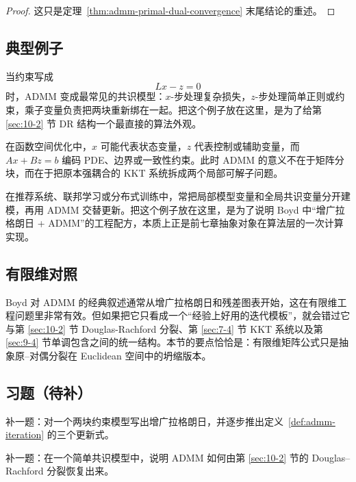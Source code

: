 \begin{proof}
这只是定理~\ref{thm:admm-primal-dual-convergence} 末尾结论的重述。
\end{proof}

\subsection{典型例子}

\begin{example}
当约束写成
\[
Lx-z=0
\]
时，ADMM 变成最常见的共识模型：$x$-步处理复杂损失，$z$-步处理简单正则或约束，乘子变量负责把两块重新绑在一起。把这个例子放在这里，是为了给第 \ref{sec:10-2} 节 DR 结构一个最直接的算法外观。
\end{example}

\begin{example}[函数空间上的一致性约束分裂]
在函数空间优化中，$x$ 可能代表状态变量，$z$ 代表控制或辅助变量，而 $Ax+Bz=b$ 编码 PDE、边界或一致性约束。此时 ADMM 的意义不在于矩阵分块，而在于把原本强耦合的 KKT 系统拆成两个局部可解子问题。
\end{example}

\begin{example}[推荐系统与分布式共识]
在推荐系统、联邦学习或分布式训练中，常把局部模型变量和全局共识变量分开建模，再用 ADMM 交替更新。把这个例子放在这里，是为了说明 Boyd 中“增广拉格朗日 + ADMM”的工程配方，本质上正是前七章抽象对象在算法层的一次计算实现。
\end{example}

\subsection*{有限维对照}

Boyd 对 ADMM 的经典叙述通常从增广拉格朗日和残差图表开始，这在有限维工程问题里非常有效。但如果把它只看成一个“经验上好用的迭代模板”，就会错过它与第 \ref{sec:10-2} 节 Douglas-Rachford 分裂、第 \ref{sec:7-4} 节 KKT 系统以及第 \ref{sec:9-4} 节单调包含之间的统一结构。本节的要点恰恰是：有限维矩阵公式只是抽象原--对偶分裂在 Euclidean 空间中的坍缩版本。

\subsection*{习题（待补）}

\begin{exercise}[增广拉格朗日占位]
补一题：对一个两块约束模型写出增广拉格朗日，并逐步推出定义~\ref{def:admm-iteration} 的三个更新式。
\end{exercise}

\begin{exercise}
补一题：在一个简单共识模型中，说明 ADMM 如何由第 \ref{sec:10-2} 节的 Douglas--Rachford 分裂恢复出来。
\end{exercise}
